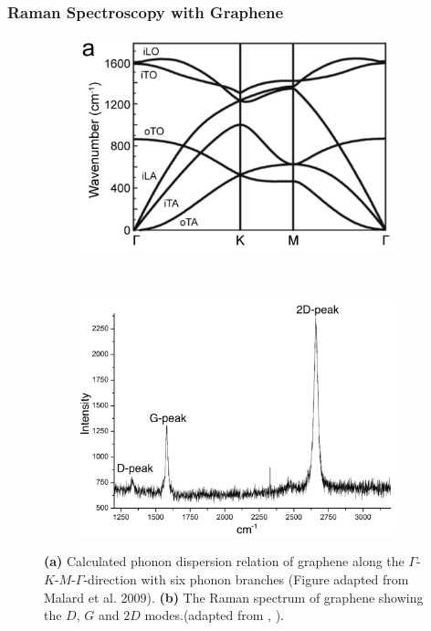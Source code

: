 \subsubsection{Raman Spectroscopy with Graphene}

\begin{figure}[!h]
  \centering
  \begin{subfigure}{0.45\textwidth}
    \includegraphics[width=\textwidth]{./images/phonon-modes.png}
  \end{subfigure}
  ~
  \begin{subfigure}{0.45\textwidth}
    \includegraphics[width=\textwidth]{./images/graphene-raman.png}
  \end{subfigure}
  \caption{\textbf{(a)} Calculated phonon dispersion relation of graphene along the $\Gamma$-$K$-$M$-$\Gamma$-direction with six phonon branches (Figure adapted from Malard et al. 2009\mcite). \textbf{(b)} The Raman spectrum of graphene showing the $D$, $G$ and $2D$ modes.(adapted from \mcite, ).}
\end{figure}

